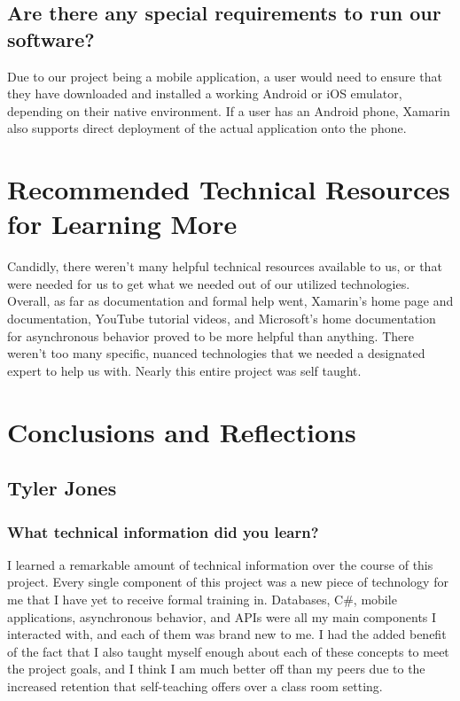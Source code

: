 \documentclass[onecolumn, draftclsnofoot,10pt, compsoc]{IEEEtran}
\begin{document}
\subsection{Are there any special requirements to run our software?}
Due to our project being a mobile application, a user would need to ensure that they have downloaded and installed a working Android or iOS emulator, depending on their native environment. If a user has an Android phone, Xamarin also supports direct deployment of the actual application onto the phone.

\newpage

\section{Recommended Technical Resources for Learning More}
Candidly, there weren't many helpful technical resources available to us, or that were needed for us to get what we needed out of our utilized technologies. Overall, as far as documentation and formal help went, Xamarin's home page and documentation, YouTube tutorial videos, and Microsoft's home documentation for asynchronous behavior proved to be more helpful than anything. There weren't too many specific, nuanced technologies that we needed a designated expert to help us with. Nearly this entire project was self taught.
\section{Conclusions and Reflections}
\subsection{Tyler Jones}
\subsubsection{What technical information did you learn?}
I learned a remarkable amount of technical information over the course of this project. Every single component of this project was a new piece of technology for me that I have yet to receive formal training in. Databases, C\#, mobile applications, asynchronous behavior, and APIs were all my main components I interacted with, and each of them was brand new to me. I had the added benefit of the fact that I also taught myself enough about each of these concepts to meet the project goals, and I think I am much better off than my peers due to the increased retention that self-teaching offers over a class room setting.
\end{document}
